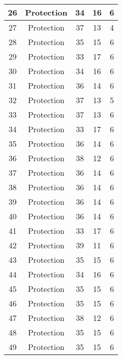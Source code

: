 \documentclass[results.tex]{subfiles}
\begin{document}
\begin{center}
\begin{tabular}{| c || c | c | c | c |}
    \hline
    26 & Protection & 34 & 16 & 6 \\ 
    \hline
    27 & Protection & 37 & 13 & 4 \\ 
    \hline
    28 & Protection & 35 & 15 & 6 \\ 
    \hline
    29 & Protection & 33 & 17 & 6 \\ 
    \hline
    30 & Protection & 34 & 16 & 6 \\ 
    \hline
    31 & Protection & 36 & 14 & 6 \\ 
    \hline
    32 & Protection & 37 & 13 & 5 \\ 
    \hline
    33 & Protection & 37 & 13 & 6 \\ 
    \hline
    34 & Protection & 33 & 17 & 6 \\ 
    \hline
    35 & Protection & 36 & 14 & 6 \\ 
    \hline
    36 & Protection & 38 & 12 & 6 \\ 
    \hline
    37 & Protection & 36 & 14 & 6 \\ 
    \hline
    38 & Protection & 36 & 14 & 6 \\ 
    \hline
    39 & Protection & 36 & 14 & 6 \\ 
    \hline
    40 & Protection & 36 & 14 & 6 \\ 
    \hline
    41 & Protection & 33 & 17 & 6 \\ 
    \hline
    42 & Protection & 39 & 11 & 6 \\ 
    \hline
    43 & Protection & 35 & 15 & 6 \\ 
    \hline
    44 & Protection & 34 & 16 & 6 \\ 
    \hline
    45 & Protection & 35 & 15 & 6 \\ 
    \hline
    46 & Protection & 35 & 15 & 6 \\ 
    \hline
    47 & Protection & 38 & 12 & 6 \\ 
    \hline
    48 & Protection & 35 & 15 & 6 \\ 
    \hline
    49 & Protection & 35 & 15 & 6 \\ 
    \hline   \end{tabular}
\end{center}
\end{document}
